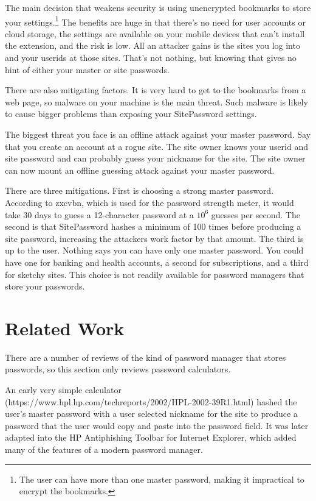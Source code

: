 The main decision that weakens security is using unencrypted bookmarks to store your settings.\footnote{The user can have more than one master password, making it impractical to encrypt the bookmarks.}  The benefits are huge in that there's no need for user accounts or cloud storage, the settings are available on your mobile devices that can't install the extension, and the risk is low.  All an attacker gains is the sites you log into and your userids at those sites.  That's not nothing, but knowing that gives no hint of either your master or site passwords.

There are also mitigating factors.  It is very hard to get to the bookmarks from a web page, so malware on your machine is the main threat.  Such malware is likely to cause bigger problems than exposing your SitePassword settings.

The biggest threat you face is an offline attack against your master password.  Say that you create an account at a rogue site.  The site owner knows your userid and site password and can probably guess your nickname for the site.  The site owner can now mount an offline guessing attack against your master password.

There are three mitigations.  First is choosing a strong master password.  According to zxcvbn, which is used for the password strength meter, it would take 30 days to guess a 12-character password at a $10^6$ guesses per second.  The second is that SitePassword hashes a minimum of 100 times before producing a site password, increasing the attackers work factor by that amount.  The third is up to the user.  Nothing says you can have only one master password.  You could have one for banking and health accounts, a second for subscriptions, and a third for sketchy sites.  This choice is not readily available for password managers that store your passwords. 

\section{Related Work}\label{sec:related}

There are a number of reviews of the kind of password manager that stores passwords, so this section only reviews password calculators.

An early very simple calculator (https://www.hpl.hp.com/techreports/2002/HPL-2002-39R1.html) hashed the user's master password with a user selected nickname for the site to produce a password that the user would copy and paste into the password field.  It was later adapted into the HP Antiphishing Toolbar for Internet Explorer, which added many of the features of a modern password manager.


